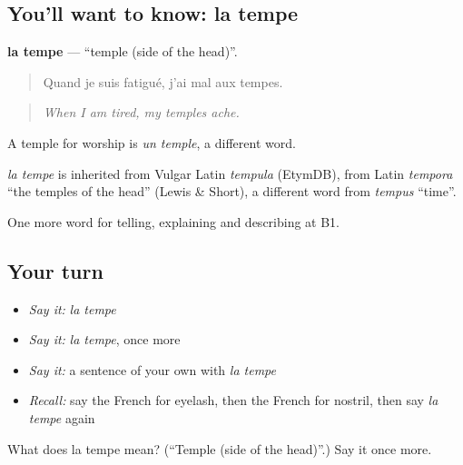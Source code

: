 \subsection*{You'll want to know: la tempe}
\textbf{la tempe} — \textquotedblleft{}temple (side of the head)\textquotedblright{}.

\begin{quote}
Quand je suis fatigué, j'ai mal aux tempes.
\end{quote}

\begin{quote}
\emph{When I am tired, my temples ache.}
\end{quote}

A temple for worship is \emph{un temple}, a different word.

\begin{cousinweb}
\emph{la tempe} is inherited from Vulgar Latin \emph{tempula} (EtymDB), from Latin \emph{tempora} \textquotedblleft{}the temples of the head\textquotedblright{} (Lewis \& Short), a different word from \emph{tempus} \textquotedblleft{}time\textquotedblright{}.
\end{cousinweb}

\begin{grammarlens}[title={What you've built}]
One more word for telling, explaining and describing at B1.
\end{grammarlens}

\subsection*{Your turn}
\begin{itemize}
\raggedright
  \item \emph{Say it:} \emph{la tempe}
  \item \emph{Say it:} \emph{la tempe}, once more
  \item \emph{Say it:} a sentence of your own with \emph{la tempe}
  \item \emph{Recall:} say the French for eyelash, then the French for nostril, then say \emph{la tempe} again
\end{itemize}

\begin{tcolorbox}[breakable,colback=teal!4,colframe=teal!35!black,title={Before you move on}]
What does la tempe mean? (\textquotedblleft{}Temple (side of the head)\textquotedblright{}.) Say it once more.
\end{tcolorbox}
